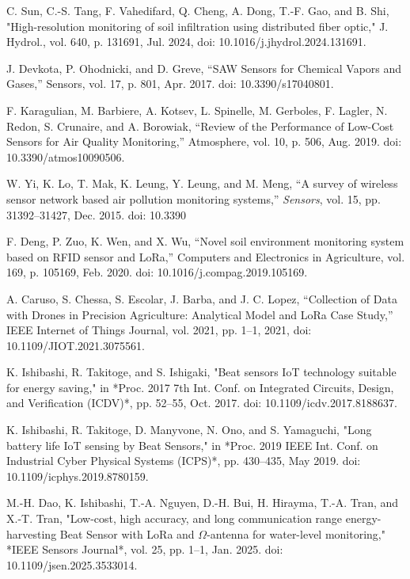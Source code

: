 \documentclass[conference]{IEEEtran}
\begin{document}
\begin{thebibliography}{00}
 C. Sun, C.-S. Tang, F. Vahedifard, Q. Cheng, A. Dong, T.-F. Gao, and B. Shi, "High-resolution monitoring of soil infiltration using distributed fiber optic," J. Hydrol., vol. 640, p. 131691, Jul. 2024, doi: 10.1016/j.jhydrol.2024.131691.

 J. Devkota, P. Ohodnicki, and D. Greve, 
``SAW Sensors for Chemical Vapors and Gases,'' 
Sensors, vol. 17, p. 801, Apr. 2017. 
doi: 10.3390/s17040801.

 F. Karagulian, M. Barbiere, A. Kotsev, L. Spinelle, M. Gerboles, F. Lagler, N. Redon, S. Crunaire, and A. Borowiak, 
``Review of the Performance of Low-Cost Sensors for Air Quality Monitoring,'' 
Atmosphere, vol. 10, p. 506, Aug. 2019. doi: 10.3390/atmos10090506.

 W. Yi, K. Lo, T. Mak, K. Leung, Y. Leung, and M. Meng, ``A survey of wireless sensor network based air pollution monitoring systems,'' \emph{Sensors}, vol. 15, pp. 31392--31427, Dec. 2015. doi: 10.3390

 F. Deng, P. Zuo, K. Wen, and X. Wu, 
``Novel soil environment monitoring system based on RFID sensor and LoRa,'' 
Computers and Electronics in Agriculture, vol. 169, p. 105169, Feb. 2020. doi: 10.1016/j.compag.2019.105169.

 A. Caruso, S. Chessa, S. Escolar, J. Barba, and J. C. Lopez, “Collection of Data with Drones in Precision Agriculture: Analytical Model and LoRa Case Study,” IEEE Internet of Things Journal, vol. 2021, pp. 1–1, 2021, doi: 10.1109/JIOT.2021.3075561.

K. Ishibashi, R. Takitoge, and S. Ishigaki, 
"Beat sensors IoT technology suitable for energy saving," 
in *Proc. 2017 7th Int. Conf. on Integrated Circuits, Design, and Verification (ICDV)*, pp. 52--55, Oct. 2017. doi: 10.1109/icdv.2017.8188637.

K. Ishibashi, R. Takitoge, D. Manyvone, N. Ono, and S. Yamaguchi, 
"Long battery life IoT sensing by Beat Sensors," 
in *Proc. 2019 IEEE Int. Conf. on Industrial Cyber Physical Systems (ICPS)*, pp. 430--435, May 2019. doi: 10.1109/icphys.2019.8780159.

M.-H. Dao, K. Ishibashi, T.-A. Nguyen, D.-H. Bui, H. Hirayma, T.-A. Tran, and X.-T. Tran, 
"Low-cost, high accuracy, and long communication range energy-harvesting Beat Sensor with LoRa and $\Omega$-antenna for water-level monitoring,"
*IEEE Sensors Journal*, vol. 25, pp. 1--1, Jan. 2025. doi: 10.1109/jsen.2025.3533014.


\end{thebibliography}
\end{document}
